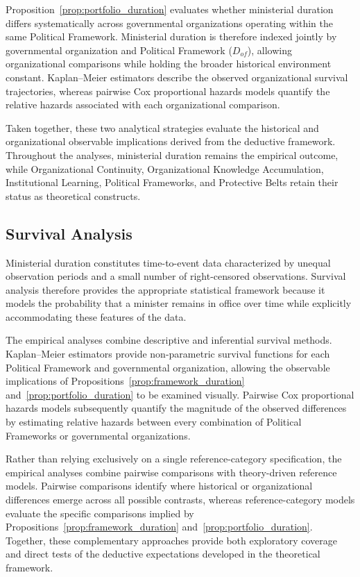 \documentclass[doc, 12pt, a4paper,floatsintext]{apa7}
\begin{document}
Proposition~\ref{prop:portfolio_duration} evaluates whether ministerial duration differs systematically across governmental organizations operating within the same Political Framework. Ministerial duration is therefore indexed jointly by governmental organization and Political Framework ($D_{of}$), allowing organizational comparisons while holding the broader historical environment constant. Kaplan--Meier estimators describe the observed organizational survival trajectories, whereas pairwise Cox proportional hazards models quantify the relative hazards associated with each organizational comparison.

Taken together, these two analytical strategies evaluate the historical and organizational observable implications derived from the deductive framework. Throughout the analyses, ministerial duration remains the empirical outcome, while Organizational Continuity, Organizational Knowledge Accumulation, Institutional Learning, Political Frameworks, and Protective Belts retain their status as theoretical constructs.

\subsection{Survival Analysis}

Ministerial duration constitutes time-to-event data characterized by unequal observation periods and a small number of right-censored observations. Survival analysis therefore provides the appropriate statistical framework because it models the probability that a minister remains in office over time while explicitly accommodating these features of the data.

The empirical analyses combine descriptive and inferential survival methods. Kaplan--Meier estimators provide non-parametric survival functions for each Political Framework and governmental organization, allowing the observable implications of Propositions~\ref{prop:framework_duration} and~\ref{prop:portfolio_duration} to be examined visually. Pairwise Cox proportional hazards models subsequently quantify the magnitude of the observed differences by estimating relative hazards between every combination of Political Frameworks or governmental organizations.

Rather than relying exclusively on a single reference-category specification, the empirical analyses combine pairwise comparisons with theory-driven reference models. Pairwise comparisons identify where historical or organizational differences emerge across all possible contrasts, whereas reference-category models evaluate the specific comparisons implied by Propositions~\ref{prop:framework_duration} and~\ref{prop:portfolio_duration}. Together, these complementary approaches provide both exploratory coverage and direct tests of the deductive expectations developed in the theoretical framework.
\end{document}
